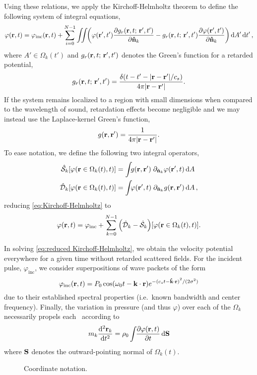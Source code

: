 Using these relations, we apply the Kirchoff-Helmholtz theorem to define the following system of integral equations,
\begin{equation}
  \varphi(\vb{r}, t) = \varphi_\text{inc}(\vb{r}, t) + \sum_{i = 0}^{N - 1} \iint_{} \kern0.1em
  \qty( \varphi(\vb{r}',t') \pdv{\ensuremath{g_r(\vb{r}, t; \, \vb{r}', t')}}{\vu{n}_k} - g_r(\vb{r}, t; \, \vb{r}', t') \pdv{\varphi(\vb{r}',t')}{\vu{n}_k} ) \dd{A'} \dd{t'},
  \label{eq:Kirchoff-Helmholtz}
\end{equation}
where $A' \in \Omega_k(t')$ and $g_r(\vb{r}, t; \, \vb{r}', t')$ denotes the Green's function for a retarded potential,
\begin{equation}
  g_r(\vb{r}, t; \, \vb{r}', t') = \frac{\delta\qty(t - t' - \abs{\vb{r}-\vb{r}'}/c_s)}{4\pi \abs{\vb{r}-\vb{r}'}}.
  \label{eq:retarded green's function}
\end{equation}
If the system remains localized to a region with small dimensions when compared to the wavelength of sound, retardation effects become negligible and we may instead use the Laplace-kernel Green's function,
\begin{equation}
  g\qty(\vb{r}, \vb{r}') = \frac{1}{4\pi\abs{\vb{r} - \vb{r}'}}.
  \label{eq:green's function}
\end{equation}
To ease notation, we define the following two integral operators,
\begin{subequations}
\begin{align}
  \hat{\mathcal{S}}_k\qty[\varphi(\vb{r} \in \Omega_k(t), t)] &= \int_{} g(\vb{r}, \vb{r}') \; \partial_{\vu{n}_k} \varphi(\vb{r}',t) \dd{A}
  \label{eq:single layer}\\
  \hat{\mathcal{D}}_k\qty[\varphi(\vb{r} \in \Omega_k(t), t)] &= \int_{} \varphi(\vb{r}',t) \; \partial_{\vu{n}_k} g(\vb{r}, \vb{r}') \dd{A}, \label{eq:double layer}
\end{align}
  \label{eq:operator_kirchoff}
\end{subequations}
reducing \cref{eq:Kirchoff-Helmholtz} to
\begin{equation}
  \varphi(\vb{r},t) = \varphi_\text{inc} + \sum_{k = 0}^{N - 1} \qty(\hat{\mathcal{D}}_k - \hat{\mathcal{S}}_k)\qty[\varphi(\vb{r} \in \Omega_k(t), t)].
  \label{eq:reduced Kirchoff-Helmholtz}
\end{equation}

In solving \cref{eq:reduced Kirchoff-Helmholtz}, we obtain the velocity potential everywhere for a given time without retarded scattered fields.
For the incident pulse, $\varphi_\text{inc}$, we consider superpositions of wave packets of the form
\begin{equation}
  \varphi_\text{inc}(\vb{r}, t) = P_0\cos(\omega_0 t - \vb{k}\cdot\vb{r})e^{-{(c_s t - \vu{k}\cdot\vb{r})}^2/(2 \sigma^2)}
  \label{eq:inc_field}
\end{equation}
due to their established spectral properties (i.e.\ known bandwidth and center frequency).
Finally, the variation in pressure (and thus $\varphi$) over each of the $\Omega_k$ necessarily propels each \bubble\ according to
\begin{equation}
  m_k \dv[2]{\vb{r}_k}{t} = \rho_0 \int_{} \kern0.1em \pdv{\varphi\qty(\vb{r}, t)}{t} \dd{\vb{S}}
  \label{eq:Newton}
\end{equation}
where $\vb{S}$ denotes the outward-pointing normal of $\Omega_k(t)$.

\begin{figure}[t]
  \centering
  \caption{\label{fig:diagram}Coordinate notation.}
\end{figure}

